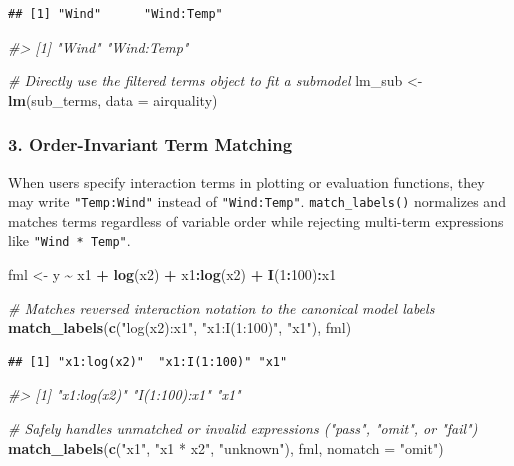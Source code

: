 \documentclass[
]{article}
\newenvironment{Shaded}{\begin{snugshade}}{\end{snugshade}}
\newcommand{\AttributeTok}[1]{\textcolor[rgb]{0.13,0.29,0.53}{#1}}
\newcommand{\CommentTok}[1]{\textcolor[rgb]{0.56,0.35,0.01}{\textit{#1}}}
\newcommand{\DecValTok}[1]{\textcolor[rgb]{0.00,0.00,0.81}{#1}}
\newcommand{\FunctionTok}[1]{\textcolor[rgb]{0.13,0.29,0.53}{\textbf{#1}}}
\newcommand{\NormalTok}[1]{#1}
\newcommand{\OtherTok}[1]{\textcolor[rgb]{0.56,0.35,0.01}{#1}}
\newcommand{\SpecialCharTok}[1]{\textcolor[rgb]{0.81,0.36,0.00}{\textbf{#1}}}
\newcommand{\StringTok}[1]{\textcolor[rgb]{0.31,0.60,0.02}{#1}}
\begin{document}
\begin{verbatim}
## [1] "Wind"      "Wind:Temp"
\end{verbatim}

\begin{Shaded}
\begin{Highlighting}[]
\CommentTok{\#\textgreater{} [1] "Wind"      "Wind:Temp"}

\CommentTok{\# Directly use the filtered terms object to fit a submodel}
\NormalTok{lm\_sub }\OtherTok{\textless{}{-}} \FunctionTok{lm}\NormalTok{(sub\_terms, }\AttributeTok{data =}\NormalTok{ airquality)}
\end{Highlighting}
\end{Shaded}

\subsubsection{3. Order-Invariant Term
Matching}\label{order-invariant-term-matching}

When users specify interaction terms in plotting or evaluation
functions, they may write \texttt{"Temp:Wind"} instead of
\texttt{"Wind:Temp"}. \texttt{match\_labels()} normalizes and matches
terms regardless of variable order while rejecting multi-term
expressions like \texttt{"Wind\ *\ Temp"}.

\begin{Shaded}
\begin{Highlighting}[]
\NormalTok{fml }\OtherTok{\textless{}{-}}\NormalTok{ y }\SpecialCharTok{\textasciitilde{}}\NormalTok{ x1 }\SpecialCharTok{+} \FunctionTok{log}\NormalTok{(x2) }\SpecialCharTok{+}\NormalTok{ x1}\SpecialCharTok{:}\FunctionTok{log}\NormalTok{(x2) }\SpecialCharTok{+} \FunctionTok{I}\NormalTok{(}\DecValTok{1}\SpecialCharTok{:}\DecValTok{100}\NormalTok{)}\SpecialCharTok{:}\NormalTok{x1}

\CommentTok{\# Matches reversed interaction notation to the canonical model labels}
\FunctionTok{match\_labels}\NormalTok{(}\FunctionTok{c}\NormalTok{(}\StringTok{"log(x2):x1"}\NormalTok{, }\StringTok{"x1:I(1:100)"}\NormalTok{, }\StringTok{"x1"}\NormalTok{), fml)}
\end{Highlighting}
\end{Shaded}

\begin{verbatim}
## [1] "x1:log(x2)"  "x1:I(1:100)" "x1"
\end{verbatim}

\begin{Shaded}
\begin{Highlighting}[]
\CommentTok{\#\textgreater{} [1] "x1:log(x2)"  "I(1:100):x1" "x1"}

\CommentTok{\# Safely handles unmatched or invalid expressions ("pass", "omit", or "fail")}
\FunctionTok{match\_labels}\NormalTok{(}\FunctionTok{c}\NormalTok{(}\StringTok{"x1"}\NormalTok{, }\StringTok{"x1 * x2"}\NormalTok{, }\StringTok{"unknown"}\NormalTok{), fml, }\AttributeTok{nomatch =} \StringTok{"omit"}\NormalTok{)}
\end{Highlighting}
\end{Shaded}
\end{document}
